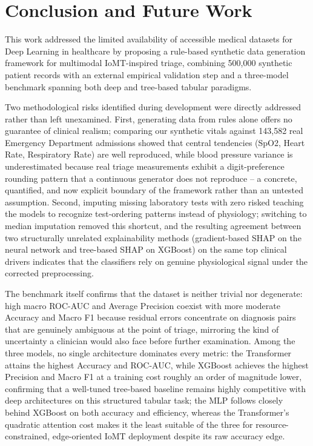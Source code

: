\section{Conclusion and Future Work}

This work addressed the limited availability of accessible medical datasets for Deep Learning in healthcare by proposing a rule-based synthetic data generation framework for multimodal IoMT-inspired triage, combining 500,000 synthetic patient records with an external empirical validation step and a three-model benchmark spanning both deep and tree-based tabular paradigms.

Two methodological risks identified during development were directly addressed rather than left unexamined. First, generating data from rules alone offers no guarantee of clinical realism; comparing our synthetic vitals against 143,582 real Emergency Department admissions showed that central tendencies (SpO2, Heart Rate, Respiratory Rate) are well reproduced, while blood pressure variance is underestimated because real triage measurements exhibit a digit-preference rounding pattern that a continuous generator does not reproduce -- a concrete, quantified, and now explicit boundary of the framework rather than an untested assumption. Second, imputing missing laboratory tests with zero risked teaching the models to recognize test-ordering patterns instead of physiology; switching to median imputation removed this shortcut, and the resulting agreement between two structurally unrelated explainability methods (gradient-based SHAP on the neural network and tree-based SHAP on XGBoost) on the same top clinical drivers indicates that the classifiers rely on genuine physiological signal under the corrected preprocessing.

The benchmark itself confirms that the dataset is neither trivial nor degenerate: high macro ROC-AUC and Average Precision coexist with more moderate Accuracy and Macro F1 because residual errors concentrate on diagnosis pairs that are genuinely ambiguous at the point of triage, mirroring the kind of uncertainty a clinician would also face before further examination. Among the three models, no single architecture dominates every metric: the Transformer attains the highest Accuracy and ROC-AUC, while XGBoost achieves the highest Precision and Macro F1 at a training cost roughly an order of magnitude lower, confirming that a well-tuned tree-based baseline remains highly competitive with deep architectures on this structured tabular task; the MLP follows closely behind XGBoost on both accuracy and efficiency, whereas the Transformer's quadratic attention cost makes it the least suitable of the three for resource-constrained, edge-oriented IoMT deployment despite its raw accuracy edge.


